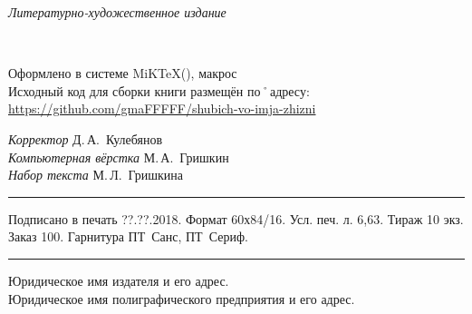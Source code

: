 ﻿\clearpage

\thispagestyle{empty}
\noindent\begin{center}
	{\itshape Литературно-художественное издание\par}
\end{center}	
\vfill\noindent
\begin{center}
	{\large{\bfseries\MakeUppercase{\AuthorFam}} \AuthorName\\[3ex]}	
	{\LARGE\Title}
\end{center}

\vfill\noindent
\begin{center}
	Оформлено в системе MiK\TeX(\LaTeXe), макрос \KOMAScript\\[1ex]
	Исходный код для сборки книги размещён по˚адресу: \footnotesize\url{https://github.com/gmaFFFFF/shubich-vo-imja-zhizni}
\end{center}
	
\vfill\noindent
\begin{center}
	\small 
	{\itshape Корректор} Д.\,А.~Кулебянов\\[1ex]
	{\itshape Компьютерная вёрстка} М.\,А.~Гришкин\\[1ex]
	{\itshape Набор текста} М.\,Л.~Гришкина\\[1ex]
\end{center}

\vfill\noindent
\rule{\textwidth}{.5pt}
\begin{center}
	\small Подписано в печать  ??.??.2018. Формат 60х84/16. Усл. печ. л. 6,63. Тираж 10 экз. Заказ 100. Гарнитура ПТ~Санс, ПТ~Сериф.		
\end{center}
\rule{\textwidth}{.5pt}

\vfil\noindent		
\begin{center}
		\small
		
		Юридическое имя издателя и его адрес.\\[1ex]
				
		Юридическое имя полиграфического предприятия и его адрес.
\end{center}

